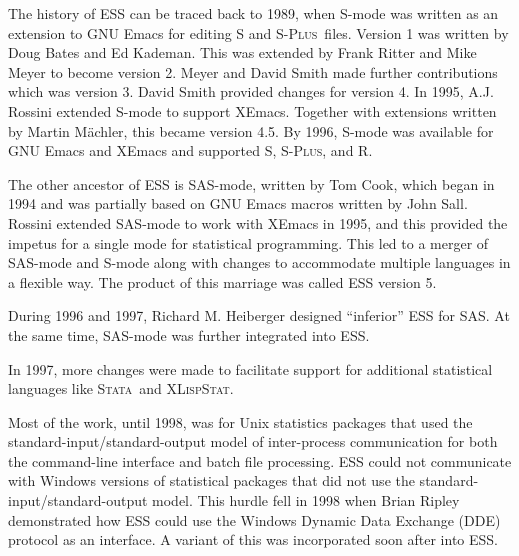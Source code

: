 \documentclass{article}
\newcommand*{\SAS}{\textsc{SAS}}
\newcommand*{\Splus}{\textsc{S-Plus}}
\newcommand*{\XLispStat}{\textsc{XLispStat}}
\newcommand*{\Stata}{\textsc{Stata}}
\newcommand{\stexttt}[1]{{\small\texttt{#1}}}
\begin{document}
The history of ESS can be traced back to 1989, when S-mode was written
as an extension to GNU Emacs for editing S and \Splus\ files.  Version
1 was written by Doug Bates and Ed Kademan.  This was extended by
Frank Ritter and Mike Meyer to become version 2.  Meyer and David
Smith made further contributions which was version 3. David Smith
provided changes for version 4.
In 1995, A.J. Rossini extended S-mode to support XEmacs.  Together
with extensions written by Martin M{\"a}chler, this
became version 4.5.  By 1996, S-mode was available for GNU Emacs and
XEmacs and supported S, \Splus, and R.  %

The other ancestor of ESS is SAS-mode, written by Tom Cook, which
began in 1994 and was partially based on GNU Emacs macros written by
John Sall.
Rossini extended SAS-mode to work with XEmacs in 1995, and this provided the
impetus for a single mode for statistical programming.
This led to a merger of SAS-mode and S-mode along with changes
to accommodate multiple languages in a flexible way.  The product of this
marriage was called ESS version 5.

During 1996 and 1997, Richard M. Heiberger designed ``inferior'' ESS for \SAS.
At the same time, SAS-mode was further integrated into ESS.

In 1997, more changes were made to facilitate
support for additional statistical languages like \Stata\ and \XLispStat.

Most of the work, until 1998, was for Unix statistics packages that
used the standard-input/standard-output model of inter-process
communication for both the command-line interface and batch file
processing.  ESS could not communicate with Windows versions of
statistical packages that did not use the
standard-input/standard-output model.  This hurdle fell in 1998 when
Brian Ripley demonstrated how ESS could use the Windows Dynamic Data
Exchange (DDE) protocol as an interface.  A variant of this was
incorporated soon after into ESS.
\end{document}
